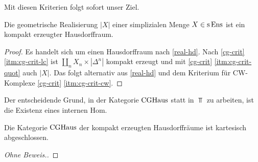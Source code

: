Mit diesen Kriterien folgt sofort unser Ziel.
\begin{kor}
  Die geometrische Realisierung $|X|$ einer simplizialen Menge $X \in
  \operatorname{s}\operatorname{Ens}$ ist ein kompakt erzeugter Hausdorffraum.
\end{kor}
\begin{proof}
  Es handelt sich um einen Hausdorffraum nach \ref{real-hd}. Nach
  \ref{cg-crit} \ref{itm:cg-crit-lc} ist $\coprod_n X_n \times
  |\Delta^n|$ kompakt erzeugt und mit \ref{cg-crit}
  \ref{itm:cg-crit-quot} auch $|X|$. Das folgt alternativ aus
  \ref{real-hd} und dem Kriterium für CW-Komplexe \ref{cg-crit}
  \ref{itm:cg-crit-cw}.
\end{proof}

Der entscheidende Grund, in der Kategorie $\operatorname{CGHaus}$ statt in $\Top$ zu
arbeiten, ist die Existenz eines internen Hom.
\begin{theorem}
  \label{cghaus-cart-closed}
  Die Kategorie $\operatorname{CGHaus}$ der kompakt erzeugten Hausdorffräume ist
  kartesisch abgeschlossen.
\end{theorem}
\begin{proof}[Ohne Beweis.] \end{proof}

